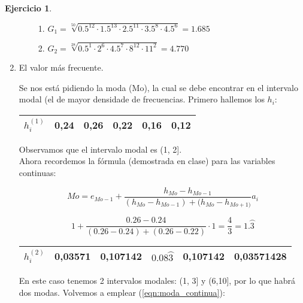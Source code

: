 \documentclass[a4paper, 12pt]{article}
\theoremstyle{definition}
\newtheorem{ej}{Ejercicio}
\begin{document}
\begin{ej}
\begin{enumerate}[label=\textit{\alph*)}]
\begin{enumerate}[label=]
        \begin{enumerate}[label=\arabic*.]
            \item \(G_1 = \sqrt[50]{0.5^{12} \cdot 1.5^{13} \cdot 2.5^{11} \cdot 3.5^8 \cdot 4.5^6} = 1.685\)
            
            \item \(G_2 = \sqrt[28]{0.5^1 \cdot 2^6 \cdot 4.5^7 \cdot 8^{12} \cdot 11^2} = 4.770\)
        \end{enumerate}
    \end{enumerate}
    
    \item El valor más frecuente.
    
    Se nos está pidiendo la moda (Mo), la cual se debe encontrar en el intervalo modal (el de mayor densidade de frecuencias. Primero hallemos los \(h_i\):
    \begin{center}
        \begin{tabular}{|c|c|c|c|c|c|}
        \hline
             \(h_i^{(1)}\) & 0,24 & 0,26 & 0,22 & 0,16 & 0,12 \\
        \hline
        \end{tabular}
    \end{center}
    
    Observamos que el intervalo modal es (1, 2]. \\
    Ahora recordemos la fórmula (demostrada en clase) para las variables continuas:
    
    \begin{equation}\label{eqn:moda_continua}
        Mo = e_{Mo-1} + \frac{h_{Mo} - h_{Mo-1}}{(h_{Mo} - h_{Mo-1}) + (h_{Mo} - h_{Mo+1)}}a_i
    \end{equation}
    
    \[
    1 + \frac{0.26 - 0.24}{(0.26-0.24) + (0.26 - 0.22)} \cdot 1 = \frac{4}{3} = 1.\wideparen{3}
    \]
    
    \begin{center}
        \begin{tabular}{|c|c|c|c|c|c|}
        \hline
             \(h_i^{(2)}\) & 0,03571 & 0,107142 & \(0.08\wideparen{3}\) & 0,107142 & 0,03571428 \\
        \hline
        \end{tabular}
    \end{center}
    
    En este caso tenemos 2 intervalos modales: (1, 3] y (6,10], por lo que habrá dos modas. Volvemos a emplear (\ref{eqn:moda_continua}):
    

\end{enumerate}
\end{ej}
\end{document}
